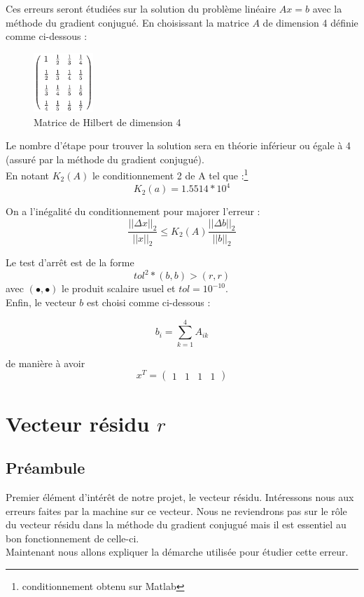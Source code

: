 \documentclass[12,french]{report}
\begin{document}
 Ces erreurs seront étudiées sur la solution du problème linéaire $Ax=b$ avec la méthode du gradient conjugué. En choisissant la matrice $A$ de dimension 4 définie comme ci-dessous :\\

\begin{figure}[H]
	\center
	\includegraphics[width=0.2\textwidth]{./Images/H_4}
	\caption{Matrice de Hilbert de dimension 4}
\end{figure}

Le nombre d'étape pour trouver la solution sera en théorie inférieur ou égale à 4 (assuré par la méthode du gradient conjugué).\\

En notant $K_2(A)$ le conditionnement 2 de A tel que :\footnote{conditionnement obtenu sur Matlab}
$$K_2(a)= 1.5514*10^4$$

On a l'inégalité du conditionnement pour majorer l'erreur :
$$\frac{||\Delta x||_{2}}{||x||_2}\leq K_2(A)\frac{||\Delta b||_{2}}{||b||_2}$$

Le test d'arrêt est de la forme $$tol^2*(b,b) > (r,r) $$
avec $(\bullet,\bullet)$ le produit scalaire usuel et $tol=10^{-10}$.\\

Enfin, le vecteur $b$ est choisi comme ci-dessous :

$$b_i=\sum_{k=1}^4A_{ik}$$

de manière à avoir 
$$x^T=\left(\begin{array}{cccc}
1 & 1 & 1 & 1\end{array}\right)$$




\chapter{Vecteur résidu $r$} %

\section{Préambule}

Premier élément d'intérêt de notre projet, le vecteur résidu. Intéressons nous aux erreurs faites par la machine sur ce vecteur. Nous ne reviendrons pas sur le rôle du vecteur résidu dans la méthode du gradient conjugué mais il est essentiel au bon fonctionnement de celle-ci.\\
Maintenant nous allons expliquer la démarche utilisée pour étudier cette erreur.
\end{document}
